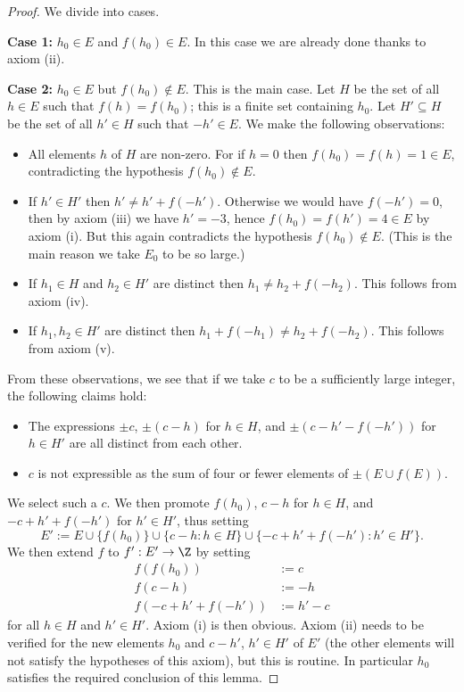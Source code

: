 \begin{proof}  We divide into cases.

  {\bf Case 1:} $h_0 \in E$ and $f(h_0) \in E$.  In this case we are already done thanks to axiom (ii).

  {\bf Case 2:} $h_0 \in E$ but $f(h_0) \not \in E$.  This is the main case.  Let $H$ be the set of all $h \in E$ such that $f(h) = f(h_0)$; this is a finite set containing $h_0$.  Let $H' \subseteq H$ be the set of all $h' \in H$ such that $-h' \in E$.  We make the following observations:
  \begin{itemize}
  \item[(a)] All elements $h$ of $H$ are non-zero.  For if $h=0$ then $f(h_0)=f(h)=1 \in E$, contradicting the hypothesis $f(h_0) \not \in E$.
  \item[(b)]  If $h' \in H'$ then $h' \neq h'+f(-h')$.  Otherwise we would have $f(-h')=0$, then by axiom (iii) we have $h' = -3$, hence $f(h_0) = f(h') = 4 \in E$ by axiom (i).  But this again contradicts the hypothesis $f(h_0) \not \in E$. (This is the main reason we take $E_0$ to be so large.)
  \item[(c)]  If $h_1 \in H$ and $h_2 \in H'$ are distinct then $h_1 \neq h_2+f(-h_2)$.  This follows from axiom (iv).
  \item[(d)]  If $h_1, h_2\in H'$ are distinct then $h_1+f(-h_1) \neq h_2+f(-h_2)$. This follows from axiom (v).
  \end{itemize}

  From these observations, we see that if we take $c$ to be a sufficiently large integer, the following claims hold:
  \begin{itemize}
  \item[1.]  The expressions $\pm c$, $\pm(c - h)$ for $h \in H$, and $\pm(c-h'-f(-h'))$ for $h \in H'$ are all distinct from each other.
  \item[2.]  $c$ is not expressible as the sum of four or fewer elements of $\pm (E \cup f(E))$.
  \end{itemize}

  We select such a $c$.  We then promote $f(h_0)$, $c - h$ for $h \in H$, and $-c+h'+f(-h')$ for $h' \in H'$, thus setting
  $$ E' := E \cup \{f(h_0)\} \cup \{ c-h: h \in H\} \cup \{ -c+h'+f(-h'): h' \in H'\}.$$
We then extend $f$ to $f': E' \to \Z$ by setting
\begin{align*}
  f(f(h_0)) &:= c \\
  f(c-h) &:= -h \\
  f(-c+h'+f(-h')) &:= h' - c
\end{align*}
for all $h \in H$ and $h' \in H'$.  Axiom (i) is then obvious.  Axiom (ii) needs to be verified for the new elements $h_0$ and $c-h'$, $h' \in H'$ of $E'$ (the other elements will not satisfy the hypotheses of this axiom), but this is routine.  In particular $h_0$ satisfies the required conclusion of this lemma.


\end{proof}
